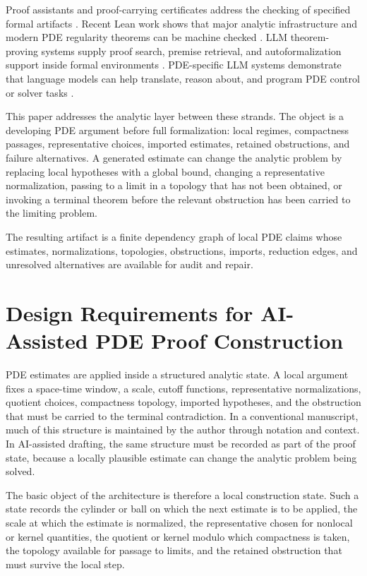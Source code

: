 \documentclass[11pt]{article}
\theoremstyle{plain}
\theoremstyle{definition}
\theoremstyle{remark}
\begin{document}
Proof assistants and proof-carrying certificates address the checking of
specified formal artifacts \cite{Necula97,Lean15}.  Recent Lean work shows
that major analytic infrastructure and modern PDE regularity theorems can be
machine checked \cite{VanDoornMacbeth2024,Doll2025,Gouezel2025,ArmstrongKempe2026}.
LLM theorem-proving systems supply proof search, premise retrieval, and
autoformalization support inside formal environments
\cite{LeanDojo2023,LeanCopilot2024,CRAMF2025}.  PDE-specific LLM systems
demonstrate that language models can help translate, reason about, and program
PDE control or solver tasks \cite{PDEController2025,CodePDE2025}.

This paper addresses the analytic layer between these strands.  The object is a
developing PDE argument before full formalization: local regimes, compactness
passages, representative choices, imported estimates, retained obstructions,
and failure alternatives.  A generated estimate can change the analytic problem
by replacing local hypotheses with a global bound, changing a representative
normalization, passing to a limit in a topology that has not been obtained, or
invoking a terminal theorem before the relevant obstruction has been carried to
the limiting problem.

The resulting artifact is a finite dependency graph of local PDE claims whose
estimates, normalizations, topologies, obstructions, imports, reduction edges,
and unresolved alternatives are available for audit and repair.

\section{Design Requirements for AI-Assisted PDE Proof Construction}
\label{sec:why-resilience}

PDE estimates are applied inside a structured analytic state.  A local
argument fixes a space-time window, a scale, cutoff functions, representative
normalizations, quotient choices, compactness topology, imported hypotheses,
and the obstruction that must be carried to the terminal contradiction.  In a
conventional manuscript, much of this structure is maintained by the author
through notation and context.  In AI-assisted drafting, the same structure must
be recorded as part of the proof state, because a locally plausible estimate can
change the analytic problem being solved.

The basic object of the architecture is therefore a local construction state.
Such a state records the cylinder or ball on which the next estimate is to be
applied, the scale at which the estimate is normalized, the representative
chosen for nonlocal or kernel quantities, the quotient or kernel modulo
which compactness is taken, the topology available for passage to limits, and
the retained obstruction that must survive the local step.
\end{document}
